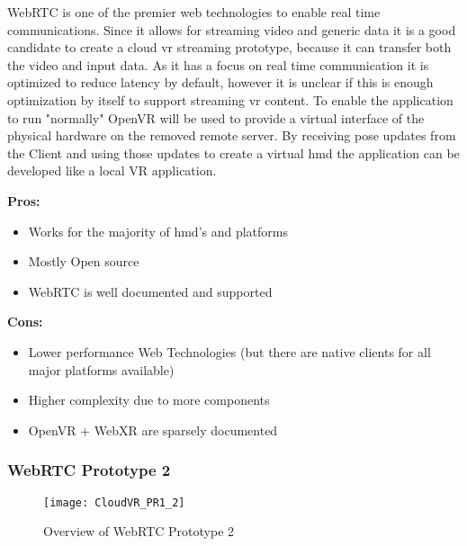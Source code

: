 WebRTC is one of the premier web technologies to enable real time communications. Since it allows for streaming video and generic data it is a good candidate to create a cloud \acrshort{vr} streaming prototype, because it can transfer both the video and input data. As it has a focus on real time communication it is optimized to reduce latency by default, however it is unclear if this is enough optimization by itself to support streaming \acrshort{vr} content. To enable the application to run "normally" OpenVR will be used to provide a virtual interface of the physical hardware on the removed remote server. By receiving pose updates from the Client and using those updates to create a virtual \acrshort{hmd} the application can be developed like a local VR application. \\
\newline
\begin{varwidth}[t]{.5\textwidth}
\renewcommand\labelitemi{+}
\textbf{Pros:}
\begin{itemize}
\item Works for the majority of \acrshort{hmd}'s and platforms
\item Mostly Open source
\item WebRTC is well documented and supported
\end{itemize}
\end{varwidth}
\hspace{4em}
\begin{varwidth}[t]{.5\textwidth}
\renewcommand\labelitemi{-}
\textbf{Cons:}
\begin{itemize}
\item Lower performance Web Technologies (but there are native clients for all major platforms available)
\item Higher complexity due to more components
\item OpenVR + WebXR are sparsely documented
\end{itemize}
\end{varwidth}

\subsubsection{WebRTC Prototype 2}
\begin{figure}[h!]
\caption{Overview of WebRTC Prototype 2}
\label{fig:pr12}
\texttt{[image: CloudVR\_PR1\_2]}
\end{figure}

